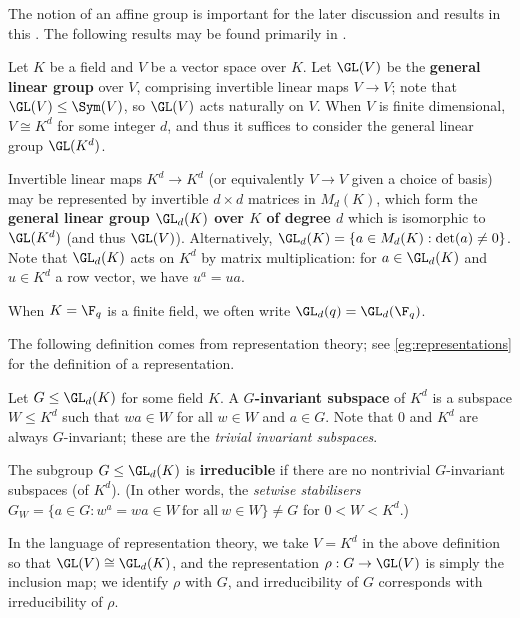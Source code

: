 The notion of an affine group is important for the later discussion and results in this \thesis{}. The following results may be found primarily in \cite{dixon_mortimer_perm_groups1996}.

\begin{definition}\label{def:gl_group}
    Let $K$ be a field and $V$ be a vector space over $K$. Let $\GL(V)$ be the \textbf{general linear group} over $V$, comprising invertible linear maps $V \to V$; note that $\GL(V) \leq \Sym(V)$, so $\GL(V)$ acts naturally on $V$. When $V$ is finite dimensional, $V \cong K^d$ for some integer $d$, and thus it suffices to consider the general linear group $\GL(K^d)$.

    Invertible linear maps $K^d \to K^d$ (or equivalently $V \to V$ given a choice of basis) may be represented by invertible $d \times d$ matrices in $M_d(K)$, which form the \textbf{general linear group $\GL_d(K)$ over $K$ of degree $d$} which is isomorphic to $\GL(K^d)$ (and thus $\GL(V)$). Alternatively, $\GL_d(K) = \{a \in M_d(K) : \det(a) \neq 0\}$. Note that $\GL_d(K)$ acts on $K^d$ by matrix multiplication: for $a \in \GL_d(K)$ and $u \in K^d$ a row vector, we have $u^a = ua$.

    When $K = \F_q$ is a finite field, we often write $\GL_d(q) = \GL_d(\F_q)$.
\end{definition}

The following definition comes from representation theory; see \autoref{eg:representations} for the definition of a representation.

\begin{definition}\label{def:irred_subgroup}
    Let $G \leq \GL_d(K)$ for some field $K$. A \textbf{$G$-invariant subspace} of $K^d$ is a subspace $W \leq K^d$ such that $wa \in W$ for all $w \in W$ and $a \in G$. Note that $0$ and $K^d$ are always $G$-invariant; these are the \textit{trivial invariant subspaces}.

    The subgroup $G \leq \GL_d(K)$ is \textbf{irreducible} if there are no nontrivial $G$-invariant subspaces (of $K^d$). (In other words, the \textit{setwise stabilisers} $G_W = \{a \in G : w^a = wa \in W\ \text{for all}\ w \in W\} \neq G$ for $0 < W < K^d$.)
\end{definition}

In the language of representation theory, we take $V = K^d$ in the above definition so that $\GL(V) \cong \GL_d(K)$, and the representation $\rho : G \to \GL(V)$ is simply the inclusion map; we identify $\rho$ with $G$, and irreducibility of $G$ corresponds with irreducibility of $\rho$.

